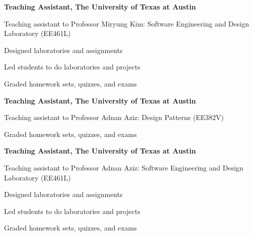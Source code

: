 

\begin{myexp}
\item \textbf{Teaching Assistant, The University of Texas at
    Austin}  
    \begin{mybullet}
        \item Teaching assistant to Professor Miryung Kim: Software Engineering
            and Design Laboratory (EE461L) 
        \item Designed laboratories and assignments
        \item Led students to do laboratories and projects
        \item Graded homework sets, quizzes, and exams
    \end{mybullet}
\item \textbf{Teaching Assistant, The University of Texas at 
    Austin}   
    \begin{mybullet}
        \item Teaching assistant to Professor Adnan Aziz: Design Patterns
            (EE382V) 
        \item Graded homework sets, quizzes, and exams
    \end{mybullet}
\item \textbf{Teaching Assistant, The University of Texas at 
    Austin}   
    \begin{mybullet}
        \item Teaching assistant to Professor Adnan Aziz: Software Engineering
            and Design Laboratory (EE461L) 
        \item Designed laboratories and assignments
        \item Led students to do laboratories and projects
        \item Graded homework sets, quizzes, and exams
    \end{mybullet}


\end{myexp}
